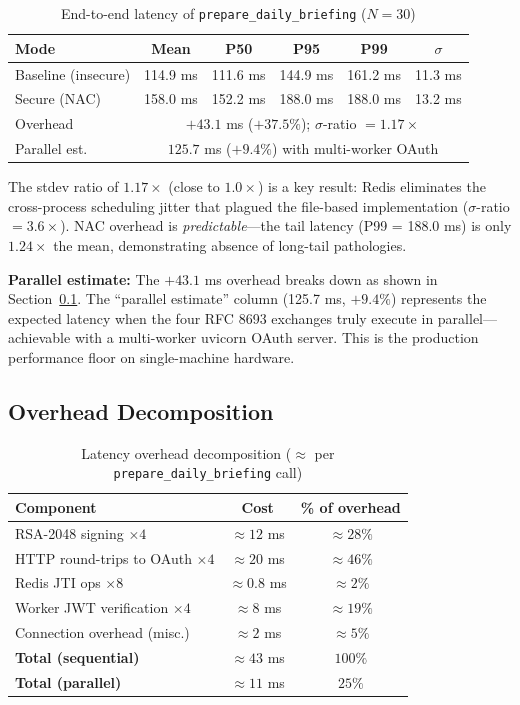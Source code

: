 \documentclass[journal]{IEEEtran}
\begin{document}
\begin{table}[h]
\caption{End-to-end latency of \texttt{prepare\_daily\_briefing} ($N=30$)}
\label{tab:latency}
\centering
\footnotesize
\begin{tabular}{lccccc}
\toprule
\textbf{Mode} & \textbf{Mean} & \textbf{P50} & \textbf{P95} & \textbf{P99} & \textbf{$\sigma$} \\
\midrule
Baseline (insecure) & 114.9 ms & 111.6 ms & 144.9 ms & 161.2 ms & 11.3 ms \\
Secure (NAC)        & 158.0 ms & 152.2 ms & 188.0 ms & 188.0 ms & 13.2 ms \\
\midrule
Overhead & \multicolumn{5}{c}{$+43.1$ ms ($+37.5\%$); $\sigma$-ratio $= 1.17\times$} \\
Parallel est.& \multicolumn{5}{c}{$125.7$ ms ($+9.4\%$) with multi-worker OAuth} \\
\bottomrule
\end{tabular}
\end{table}

The stdev ratio of $1.17\times$ (close to $1.0\times$) is a key result: Redis eliminates the cross-process scheduling jitter that plagued the file-based implementation ($\sigma$-ratio $= 3.6\times$). NAC overhead is \textit{predictable}—the tail latency (P99 = 188.0 ms) is only $1.24\times$ the mean, demonstrating absence of long-tail pathologies.

\textbf{Parallel estimate:} The $+43.1$ ms overhead breaks down as shown in Section~\ref{sec:overhead}. The ``parallel estimate'' column (125.7 ms, $+9.4\%$) represents the expected latency when the four RFC 8693 exchanges truly execute in parallel—achievable with a multi-worker uvicorn OAuth server. This is the production performance floor on single-machine hardware.

\subsection{Overhead Decomposition}
\label{sec:overhead}

\begin{table}[h]
\caption{Latency overhead decomposition ($\approx$ per \texttt{prepare\_daily\_briefing} call)}
\label{tab:decomp}
\centering
\footnotesize
\begin{tabular}{lcc}
\toprule
\textbf{Component} & \textbf{Cost} & \textbf{\% of overhead} \\
\midrule
RSA-2048 signing $\times 4$ & $\approx 12$ ms & $\approx 28\%$ \\
HTTP round-trips to OAuth $\times 4$ & $\approx 20$ ms & $\approx 46\%$ \\
Redis JTI ops $\times 8$ & $\approx 0.8$ ms & $\approx 2\%$ \\
Worker JWT verification $\times 4$ & $\approx 8$ ms & $\approx 19\%$ \\
Connection overhead (misc.) & $\approx 2$ ms & $\approx 5\%$ \\
\midrule
\textbf{Total (sequential)} & $\approx 43$ ms & $100\%$ \\
\textbf{Total (parallel)}   & $\approx 11$ ms & $25\%$ \\
\bottomrule
\end{tabular}
\end{table}
\end{document}

